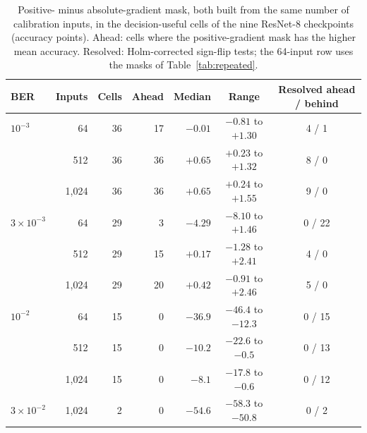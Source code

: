 \begin{table}[tbp]
\caption{Positive- minus absolute-gradient mask, both built from the same number of calibration inputs, in the decision-useful cells of the nine ResNet-8 checkpoints (accuracy points). Ahead: cells where the positive-gradient mask has the higher mean accuracy. Resolved: Holm-corrected sign-flip tests; the 64-input row uses the masks of Table~\ref{tab:repeated}.}\label{tab:calibration}
\centering\footnotesize
\begin{tabular}{l r r r r c c}\toprule
BER & Inputs & Cells & Ahead & Median & Range & Resolved ahead / behind\\\midrule
$10^{-3}$ & 64 & 36 & 17 & $-0.01$ & $-0.81$ to $+1.30$ & 4 / 1\\
 & 512 & 36 & 36 & $+0.65$ & $+0.23$ to $+1.32$ & 8 / 0\\
 & 1,024 & 36 & 36 & $+0.65$ & $+0.24$ to $+1.55$ & 9 / 0\\\midrule
$3\times10^{-3}$ & 64 & 29 & 3 & $-4.29$ & $-8.10$ to $+1.46$ & 0 / 22\\
 & 512 & 29 & 15 & $+0.17$ & $-1.28$ to $+2.41$ & 4 / 0\\
 & 1,024 & 29 & 20 & $+0.42$ & $-0.91$ to $+2.46$ & 5 / 0\\\midrule
$10^{-2}$ & 64 & 15 & 0 & $-36.9$ & $-46.4$ to $-12.3$ & 0 / 15\\
 & 512 & 15 & 0 & $-10.2$ & $-22.6$ to $-0.5$ & 0 / 13\\
 & 1,024 & 15 & 0 & $-8.1$ & $-17.8$ to $-0.6$ & 0 / 12\\\midrule
$3\times10^{-2}$ & 1,024 & 2 & 0 & $-54.6$ & $-58.3$ to $-50.8$ & 0 / 2\\\bottomrule
\end{tabular}
\end{table}

